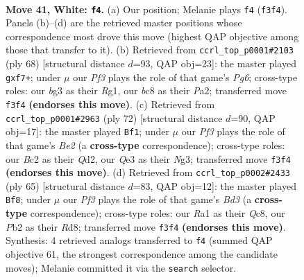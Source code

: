 \documentclass[11pt]{article}
\begin{document}
\clearpage

\begin{figure}[p]\centering
\begin{subfigure}{0.46\textwidth}\centering
\resizebox{\linewidth}{!}{%
\newchessgame
\chessboard[
  setfen={r1b4k/ppp2pp1/5n2/3q3p/1B6/4QPbP/PPB3P1/R5K1 w - - 2 41},
  showmover=false,
  pgfstyle=straightmove, color=movearrow, markmove={f3-f4}
]}
\caption{}
\end{subfigure}\hfill
\begin{subfigure}{0.46\textwidth}\centering
\resizebox{\linewidth}{!}{%
\newchessgame
\chessboard[
  setfen={4q1k1/p4pb1/1p1r2Pp/3p1B1Q/3Pp3/1P2P3/P7/6RK w - - 1 35},
  showmover=false,
  pgfstyle=straightmove, color=movearrow, markmove={g6-f7}
]}
\caption{}
\end{subfigure}
\\[4pt]
\begin{subfigure}{0.46\textwidth}\centering
\resizebox{\linewidth}{!}{%
\newchessgame
\chessboard[
  setfen={2b5/ppr3kp/1q3p2/3p2p1/3P1nP1/P5NP/1P1QBP2/4R1K1 w - - 11 37},
  showmover=false,
  pgfstyle=straightmove, color=movearrow, markmove={e2-f1}
]}
\caption{}
\end{subfigure}\hfill
\begin{subfigure}{0.46\textwidth}\centering
\resizebox{\linewidth}{!}{%
\newchessgame
\chessboard[
  setfen={2qr2k1/1p3pp1/p1pb3p/P2n4/2NP3P/1Q4P1/1P1B1P2/4R1K1 b - - 6 33},
  showmover=false,
  pgfstyle=straightmove, color=movearrow, markmove={d6-f8}
]}
\caption{}
\end{subfigure}
\caption{\textbf{Move 41, White: \texttt{f4}.} (a) Our position; Melanie plays \texttt{f4} (\texttt{f3f4}). Panels (b)--(d) are the retrieved master positions whose correspondence most drove this move (highest QAP objective among those that transfer to it). (b) Retrieved from \texttt{ccrl\_top\_p0001\#2103} (ply 68) [structural distance $d$=93, QAP obj=23]: the master played \texttt{gxf7+}; under $\mu$ our \emph{Pf3} plays the role of that game's \emph{Pg6}; cross-type roles: our \emph{b}g3 as their \emph{R}g1, our \emph{b}c8 as their \emph{P}a2; transferred move \texttt{f3f4} \textbf{(endorses this move)}. (c) Retrieved from \texttt{ccrl\_top\_p0001\#2963} (ply 72) [structural distance $d$=90, QAP obj=17]: the master played \texttt{Bf1}; under $\mu$ our \emph{Pf3} plays the role of that game's \emph{Be2} (a \textbf{cross-type} correspondence); cross-type roles: our \emph{B}c2 as their \emph{Q}d2, our \emph{Q}e3 as their \emph{N}g3; transferred move \texttt{f3f4} \textbf{(endorses this move)}. (d) Retrieved from \texttt{ccrl\_top\_p0002\#2433} (ply 65) [structural distance $d$=83, QAP obj=12]: the master played \texttt{Bf8}; under $\mu$ our \emph{Pf3} plays the role of that game's \emph{Bd3} (a \textbf{cross-type} correspondence); cross-type roles: our \emph{R}a1 as their \emph{Q}c8, our \emph{P}b2 as their \emph{R}d8; transferred move \texttt{f3f4} \textbf{(endorses this move)}. Synthesis: 4 retrieved analogs transferred to \texttt{f4} (summed QAP objective 61, the strongest correspondence among the candidate moves); Melanie committed it via the \texttt{search} selector.}
\label{fig:thought-m80}
\end{figure}
\end{document}
